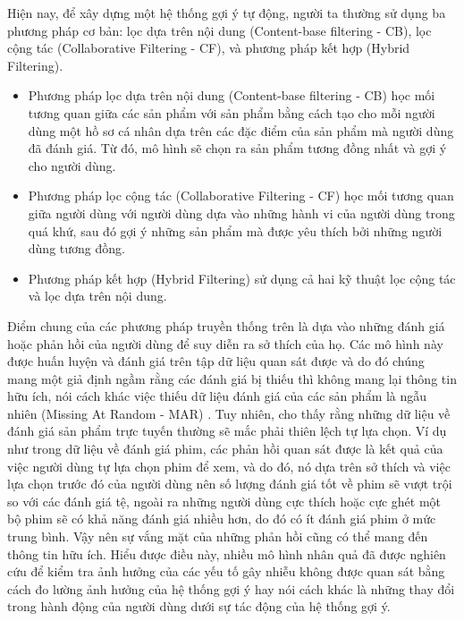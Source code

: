 \documentclass{article}[14pt]
\begin{document}
{    %
    Hiện nay, để xây dựng một hệ thống gợi ý tự động, người ta thường sử dụng ba phương pháp cơ bản: lọc dựa trên nội dung (Content-base filtering - CB), lọc cộng tác (Collaborative Filtering - CF), và phương pháp kết hợp (Hybrid Filtering). 
    \begin{itemize}
        \item Phương pháp lọc dựa trên nội dung (Content-base filtering - CB) học mối tương quan giữa các sản phẩm với sản phẩm bằng cách tạo cho mỗi người dùng một hồ sơ cá nhân dựa trên các đặc điểm của sản phẩm mà người dùng đã đánh giá. Từ đó, mô hình sẽ chọn ra sản phẩm tương đồng nhất và gợi ý cho người dùng.
        \item Phương pháp lọc cộng tác (Collaborative Filtering - CF) học mối tương quan giữa người dùng với người dùng dựa vào những hành vi của người dùng trong quá khứ, sau đó gợi ý những sản phẩm mà được yêu thích bởi những người dùng tương đồng.
        \item Phương pháp kết hợp (Hybrid Filtering) sử dụng cả hai kỹ thuật lọc cộng tác và lọc dựa trên nội dung.
    \end{itemize}
    Điểm chung của các phương pháp truyền thống trên là dựa vào những đánh giá hoặc phản hồi của người dùng để suy diễn ra sở thích của họ. Các mô hình này được huấn luyện và đánh giá trên tập dữ liệu quan sát được và do đó chúng mang một giả định ngầm rằng các đánh giá bị thiếu thì không mang lại thông tin hữu ích, nói cách khác việc thiếu dữ liệu đánh giá của các sản phẩm là ngẫu nhiên (Missing At Random - MAR) \cite{mar}. Tuy nhiên, \cite{bias} cho thấy rằng những dữ liệu về đánh giá sản phẩm trực tuyến  thường sẽ mắc phải thiên lệch tự lựa chọn. Ví dụ như trong dữ liệu về đánh giá phim, các phản hồi quan sát được là kết quả của việc người dùng tự lựa chọn phim để xem, và do đó, nó dựa trên sở thích và việc lựa chọn trước đó của người dùng nên số lượng đánh giá tốt về phim sẽ vượt trội so với các đánh giá tệ, ngoài ra những người dùng cực thích hoặc cực ghét một bộ phim sẽ có khả năng  đánh giá nhiều hơn, do đó có ít đánh giá phim ở mức trung bình. Vậy nên sự vắng mặt của những phản hồi cũng có thể mang đến thông tin hữu ích. Hiểu được điều này, nhiều mô hình nhân quả đã được nghiên cứu để kiểm tra ảnh hưởng của các yếu tố gây nhiễu không được quan sát bằng cách đo lường ảnh hưởng của hệ thống gợi ý hay nói cách khác là những thay đổi trong hành động của người dùng dưới sự tác động của hệ thống gợi ý.
    
}
\end{document}
